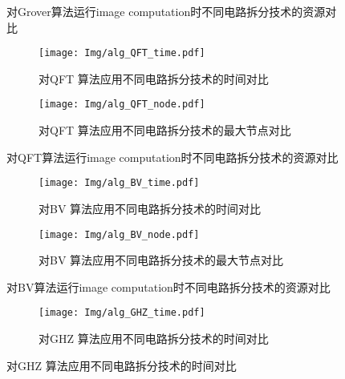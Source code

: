 \documentclass{article}
\begin{document}
\begin{itemize}[leftmargin=*]
\begin{itemize}
\begin{figure}[!htbp]
            \caption{对Grover算法运行image computation时不同电路拆分技术的资源对比}
            \label{fig:grover-compare}
        \end{figure}
        \begin{figure}[!htbp]
            \centering
            \begin{subfigure}[b]{.4\textwidth}
                \centering
                \texttt{[image: Img/alg\_QFT\_time.pdf]}
                \caption{对QFT 算法应用不同电路拆分技术的时间对比}
                \label{fig:QFT-time}
            \end{subfigure}
            \qquad
            \begin{subfigure}[b]{.4\textwidth}
                \centering
                \texttt{[image: Img/alg\_QFT\_node.pdf]}
                \caption{对QFT 算法应用不同电路拆分技术的最大节点对比}
                \label{fig:QFT-node}
            \end{subfigure}
            \caption{对QFT算法运行image computation时不同电路拆分技术的资源对比}
            \label{fig:QFT-compare}
        \end{figure}
        \begin{figure}[!htbp]
            \centering
            \begin{subfigure}[b]{.4\textwidth}
                \centering
                \texttt{[image: Img/alg\_BV\_time.pdf]}
                \caption{对BV 算法应用不同电路拆分技术的时间对比}
                \label{fig:BV-time}
            \end{subfigure}
            \qquad
            \begin{subfigure}[b]{.4\textwidth}
                \centering
                \texttt{[image: Img/alg\_BV\_node.pdf]}
                \caption{对BV 算法应用不同电路拆分技术的最大节点对比}
                \label{fig:BV-node}
            \end{subfigure}
            \caption{对BV算法运行image computation时不同电路拆分技术的资源对比}
            \label{fig:BV-compare}
        \end{figure}
        \begin{figure}[!htbp]
            \centering
            \begin{subfigure}[b]{.4\textwidth}
                \centering
                \texttt{[image: Img/alg\_GHZ\_time.pdf]}
                \caption{对GHZ 算法应用不同电路拆分技术的时间对比}
                \label{fig:GHZ-time}
            \end{subfigure}

\end{figure}
\end{itemize}
\end{itemize}
\end{document}
